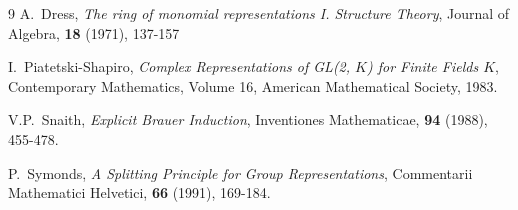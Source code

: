 \documentclass[12pt]{article}
\theoremstyle{plain}
\theoremstyle{definition}
\begin{document}
\begin{thebibliography}{9}
A.~Dress, \emph{The ring of monomial representations I. Structure Theory}, Journal of Algebra, \textbf{18} (1971), 137-157

 I.~Piatetski-Shapiro, \emph{Complex Representations of GL(2, $K$) for Finite Fields $K$}, Contemporary Mathematics, Volume 16, American Mathematical Society, 1983.

 V.P.~Snaith, \emph{Explicit Brauer Induction}, Inventiones Mathematicae, \textbf{94} (1988), 455-478.

P.~Symonds, \emph{A Splitting Principle for Group Representations}, Commentarii Mathematici Helvetici, \textbf{66} (1991), 169-184.

\end{thebibliography}
\end{document}
